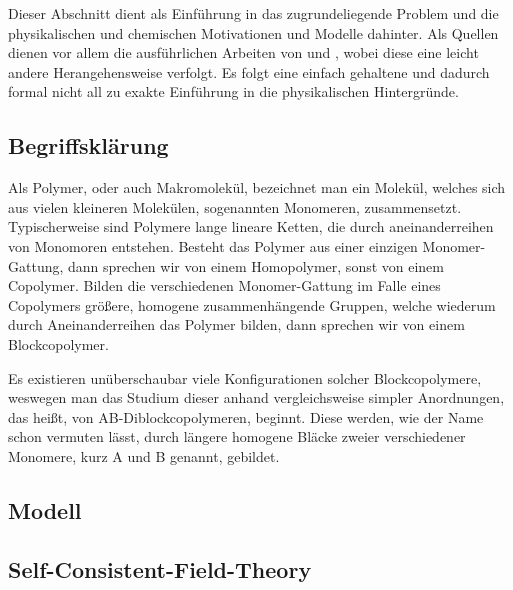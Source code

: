 Dieser Abschnitt dient als Einführung in das zugrundeliegende Problem und die physikalischen und chemischen Motivationen und Modelle dahinter.
Als Quellen dienen vor allem die ausführlichen Arbeiten von \textcite{Fredrickson:2006th} und \textcite{Matsen:2002do,Matsen:2006ud}, wobei diese eine leicht andere Herangehensweise verfolgt.
Es folgt eine einfach gehaltene und dadurch formal nicht all zu exakte Einführung in die physikalischen Hintergründe.

\subsection{Begriffsklärung} %
\label{sub:begriffskl_rung}


Als Polymer, oder auch Makromolekül, bezeichnet man ein Molekül, welches sich aus vielen kleineren Molekülen, sogenannten Monomeren, zusammensetzt.
Typischerweise sind Polymere lange lineare Ketten, die durch aneinanderreihen von Monomoren entstehen.
Besteht das Polymer aus einer einzigen Monomer-Gattung, dann sprechen wir von einem Homopolymer, sonst von einem Copolymer.
Bilden die verschiedenen Monomer-Gattung im Falle eines Copolymers größere, homogene zusammenhängende Gruppen, welche wiederum durch Aneinanderreihen das Polymer bilden, dann sprechen wir von einem Blockcopolymer.


Es existieren unüberschaubar viele Konfigurationen solcher Blockcopolymere, weswegen man das Studium dieser anhand vergleichsweise simpler Anordnungen, das heißt, von AB-Diblockcopolymeren, beginnt.
Diese werden, wie der Name schon vermuten lässt, durch längere homogene Bläcke zweier verschiedener Monomere, kurz A und B genannt, gebildet.

\subsection{Modell} %
\label{sub:modell}


\subsection{Self-Consistent-Field-Theory} %
\label{sub:self_consistent_field_theory}


